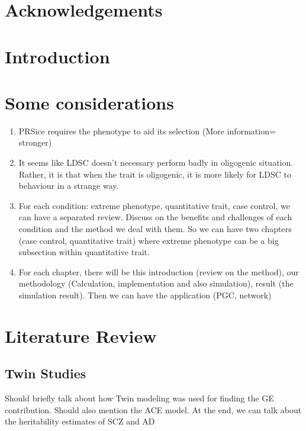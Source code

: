 \documentclass{book}
\begin{document}
	\chapter*{Acknowledgements}
	\cleardoublepage
	\printglossary[title=Abbreviations,toctitle=Abbreviations]
	\cleardoublepage
	
	\cleardoublepage
	\begin{singlespace}
		\tableofcontents
	\end{singlespace}
\mainmatter
	\chapter*{Introduction}
	\chapter*{Some considerations}
	\begin{enumerate}
		\item PRSice requires the phenotype to aid its selection (More information= stronger)
		\item It seems like LDSC doesn't necessary perform badly in oligogenic situation.
		Rather, it is that when the trait is oligogenic, it is more likely for LDSC to behaviour in a strange way.
		\item For each condition: extreme phenotype, quantitative trait, case control, we can have a separated review. 
		Discuss on the benefits and challenges of each condition and the method we deal with them.
		So we can have two chapters (case control, quantitative trait) where extreme phenotype can be a big subsection within quantitative trait.
		\item For each chapter, there will be this introduction (review on the method), our methodology (Calculation, implementation and also simulation), result (the simulation result). 
		Then we can have the application (PGC, network)
	\end{enumerate}
	
	\chapter{Literature Review}
	\section{Twin Studies}
	Should briefly talk about how Twin modeling was used for finding the GE contribution.
	Should also mention the ACE model.
	At the end, we can talk about the heritability estimates of SCZ and AD
\end{document}
